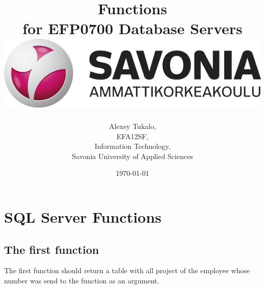 \documentclass[english]{article}
\date{}
\begin{document}
\title{\vspace{2in}Functions\\
\small for EFP0700 Database Servers\\
\vspace{0.5in}\includegraphics{savonia.jpg}}

\nopagebreak
\maketitle


\vspace{3in}

\author{
\begin{flushright}
Alexey Tukalo,\\
EFA12SF,\\
Information Technology,\\
Savonia University of Applied Sciences
\end{flushright}
}

\date{\today}
\thispagestyle{empty}

\newpage
\setcounter{page}{1}
\setcounter{tocdepth}{2}




\section{SQL Server Functions}
\subsection{The first function}
The first function should return a table with all project of the employee whose number was send to the function as an argument.
 
\end{document}
